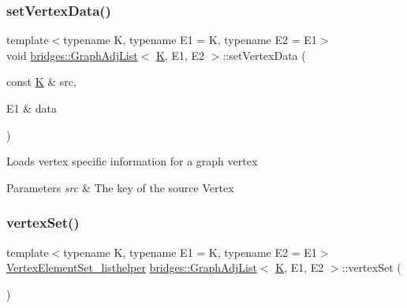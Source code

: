 \subsubsection{\texorpdfstring{setVertexData()}{setVertexData()}}
{\footnotesize\ttfamily template$<$typename K, typename E1 = K, typename E2 = E1$>$ \\
void \mbox{\hyperlink{classbridges_1_1_graph_adj_list}{bridges\+::\+Graph\+Adj\+List}}$<$ \mbox{\hyperlink{namespacebridges_acfb0a4f7877d8f63de3e6862004c50edaa5f3c6a11b03839d46af9fb43c97c188}{K}}, E1, E2 $>$\+::set\+Vertex\+Data (\begin{DoxyParamCaption}\item[{const \mbox{\hyperlink{namespacebridges_acfb0a4f7877d8f63de3e6862004c50edaa5f3c6a11b03839d46af9fb43c97c188}{K}} \&}]{src,  }\item[{E1 \&}]{data }\end{DoxyParamCaption})\hspace{0.3cm}{\ttfamily [inline]}}

\begin{DoxyVerb}Loads vertex specific information for a graph vertex
\end{DoxyVerb}



\begin{DoxyParams}{Parameters}
{\em src} & The key of the source Vertex \\
\hline
\end{DoxyParams}
\mbox{\label{classbridges_1_1_graph_adj_list_ab81f0eb58b7e94a05f13244c8557a744}} 
\subsubsection{\texorpdfstring{vertexSet()}{vertexSet()}\hspace{0.1cm}{\footnotesize\ttfamily [1/2]}}
{\footnotesize\ttfamily template$<$typename K, typename E1 = K, typename E2 = E1$>$ \\
\mbox{\hyperlink{classbridges_1_1_graph_adj_list_1_1_vertex_element_set__listhelper}{Vertex\+Element\+Set\+\_\+listhelper}} \mbox{\hyperlink{classbridges_1_1_graph_adj_list}{bridges\+::\+Graph\+Adj\+List}}$<$ \mbox{\hyperlink{namespacebridges_acfb0a4f7877d8f63de3e6862004c50edaa5f3c6a11b03839d46af9fb43c97c188}{K}}, E1, E2 $>$\+::vertex\+Set (\begin{DoxyParamCaption}{ }\end{DoxyParamCaption})\hspace{0.3cm}{\ttfamily [inline]}}



